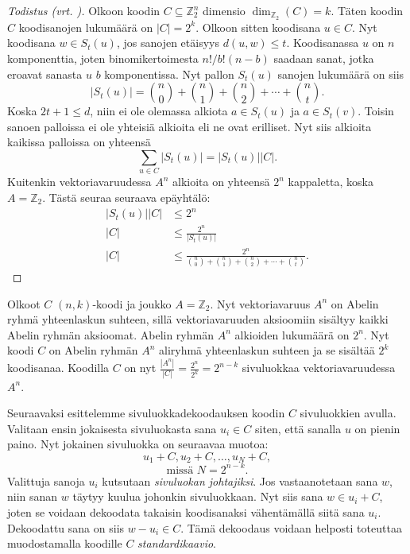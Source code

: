 \documentclass[a4paper,12pt,leqno,oneside]{report} %
\theoremstyle{plain}
\theoremstyle{plain}
\theoremstyle{definition}
\theoremstyle{remark}
\numberwithin{equation}{chapter}
\newcommand*{\Zset}{\mathbb{Z}}  %
\newcommand*{\abs}[1]{\left\lvert#1\right\rvert}   %
\begin{document}
    \begin{proof}[Todistus \upshape(vrt. {\cite[s.495]{PA}})]\label{tod:Hammingrajoitus}
        Olkoon koodin $C \subseteq \Zset_2^n$ dimensio $\dim_{\Zset_2}(C) = k$. Täten koodin $C$ koodisanojen lukumäärä on $\abs{C} = 2^k$. Olkoon sitten koodisana $u \in C$. Nyt koodisana $w \in S_t(u)$, jos sanojen etäisyys $d(u,w) \le t$. Koodisanassa $u$ on $n$ komponenttia, joten binomikertoimesta $n! / b!(n-b)\!$ saadaan sanat, jotka eroavat sanasta $u$ $b$ komponentissa. Nyt pallon $S_t(u)$ sanojen lukumäärä on siis
        \[
            \abs{S_t(u)} = \binom{n}{0} + \binom{n}{1} +\binom{n}{2} +  \cdots + \binom{n}{t}.
        \]
        Koska $2t + 1 \le d$, niin ei ole olemassa alkiota $a \in S_t(u)$ ja $a \in S_t(v)$. Toisin sanoen palloissa ei ole yhteisiä alkioita eli ne ovat erilliset. Nyt siis alkioita kaikissa palloissa on yhteensä
        \[
            \sum_{u \in C}\abs{S_t(u)} = \abs{S_t(u)}\abs{C}.
        \]
        Kuitenkin vektoriavaruudessa $A^n$ alkioita on yhteensä $2^n$ kappaletta, koska $A = \Zset_2$.
        Tästä seuraa seuraava epäyhtälö:
        \begin{align*}
            \abs{S_t(u)}\abs{C} &\le 2^n \\
            \abs{C} &\le \frac{2^n}{\abs{S_t(u)}} \\
            \abs{C} &\le \frac{2^n}{\binom{n}{0} + \binom{n}{1} +\binom{n}{2} +  \cdots + \binom{n}{t}}.
        \end{align*}
    \end{proof}

    Olkoot $C$ $(n,k)$-koodi ja joukko $A = \Zset_2$. Nyt vektoriavaruus $A^n$ on Abelin ryhmä yhteenlaskun suhteen, sillä vektoriavaruuden aksioomiin sisältyy kaikki Abelin ryhmän aksioomat. Abelin ryhmän $A^n$ alkioiden lukumäärä on $2^n$. Nyt koodi $C$ on Abelin ryhmän $A^n$ aliryhmä yhteenlaskun suhteen ja se sisältää $2^k$ koodisanaa. Koodilla $C$ on nyt $\frac{\abs{A^n}}{\abs{C}} = \frac{2^n}{2^k} = 2^{n-k}$ sivuluokkaa vektoriavaruudessa $A^n$.

    Seuraavaksi esittelemme sivuluokkadekoodauksen koodin $C$ sivuluokkien avulla. Valitaan ensin jokaisesta sivuluokasta sana $u_i \in C$ siten, että sanalla $u$ on pienin paino. Nyt jokainen sivuluokka on seuraavaa muotoa:
    \[
        u_1 + C, u_2 + C, \dots, u_N + C,
    \]
    \[
        \text{missä } N = 2^{n-k}.
    \]
     Valittuja sanoja $u_i$ kutsutaan \emph{sivuluokan johtajiksi}. Jos vastaanotetaan sana $w$, niin sanan $w$ täytyy kuulua johonkin sivuluokkaan. Nyt siis sana $w \in u_i + C$, joten se voidaan dekoodata takaisin koodisanaksi vähentämällä siitä sana $u_i$. Dekoodattu sana on siis $w - u_i \in C$. Tämä dekoodaus voidaan helposti toteuttaa muodostamalla koodille $C$ \emph{standardikaavio}.
\end{document}
